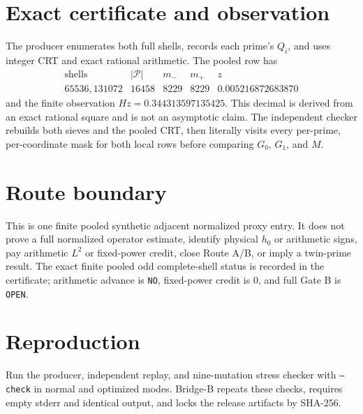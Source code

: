 \documentclass[11pt]{article}
\begin{document}
\section{Exact certificate and observation}
The producer enumerates both full shells, records each prime's $Q_i$, and
uses integer CRT and exact rational arithmetic.  The pooled row has
\[
\begin{array}{c|c|c|c|c}
\text{shells}&|\mathcal P|&m_-&m_+&z\\ \hline
65536,131072&16458&8229&8229&0.005216872683870
\end{array}
\]
and the finite observation $Hz=0.344313597135425$.  This decimal is derived
from an exact rational square and is not an asymptotic claim.  The independent
checker rebuilds both sieves and the pooled CRT, then literally visits every
per-prime, per-coordinate mask for both local rows before comparing $G_0$,
$G_1$, and $M$.

\section{Route boundary}
This is one finite pooled synthetic adjacent normalized proxy entry.  It does
not prove a full normalized operator estimate, identify physical $h_0$ or
arithmetic signs, pay arithmetic $L^2$ or fixed-power credit, close Route A/B,
or imply a twin-prime result.  The exact finite pooled odd complete-shell
status is recorded in the certificate; arithmetic
advance is \texttt{NO}, fixed-power credit is $0$, and full Gate B is
\texttt{OPEN}.

\section*{Reproduction}
Run the producer, independent replay, and nine-mutation stress checker with
\texttt{--check} in normal and optimized modes.  Bridge-B repeats these
checks, requires empty stderr and identical output, and locks the release
artifacts by SHA-256.
\end{document}
